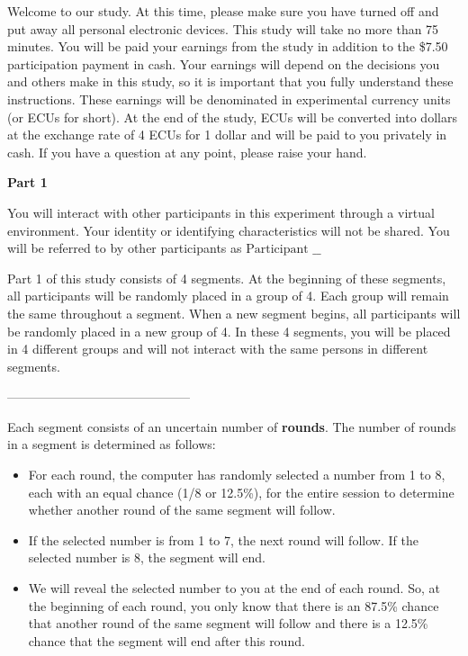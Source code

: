 \documentclass[thesis]{uathesis}
\begin{document}
\begin{body}
\begin{appendices}
Welcome to our study. At this time, please make sure you have turned off and put away
all personal electronic devices. This study will take no more than 75 minutes. You will be paid your earnings from the study in addition to the \$7.50 participation
payment in cash. Your earnings will depend on the decisions you and others make in this study, so it is important that you fully understand these instructions. These earnings will be denominated in experimental currency units (or ECUs for short). At the end of the study, ECUs will be converted into dollars at the exchange rate of 4 ECUs for 1 dollar and will be paid to you privately in cash. If you have a question at any point, please raise your hand.

\noindent\textbf{Part 1}

\medskip

You will interact with other participants in this experiment through a virtual environment. Your identity or identifying characteristics will not be shared. You will be referred to by other participants as \(\text{Participant \_\_}\)


Part 1 of this study consists of 4 segments. At the beginning of these segments, all participants will be randomly placed in a group of 4. Each group will remain the same throughout a segment. When a new segment begins, all participants will be randomly placed in a new group of 4. In these 4 segments, you will be placed in 4 different groups and will not interact with the same persons in different segments.

\vspace{0.2in}
\begin{center}
--------------------------------------------
\end{center}
\vspace{0.2in}

Each segment consists of an uncertain number of \textbf{rounds}. The number of rounds in a segment is determined as follows:
\begin{itemize}
    \item   For each round, the computer has randomly selected a number from 1 to 8, each with an equal chance (1/8 or 12.5\%), for the entire session to determine whether another round of the same segment will follow.
    \item 	If the selected number is from 1 to 7, the next round will follow. If the selected number is 8, the segment will end.
    \item 	We will reveal the selected number to you at the end of each round. So, at the beginning of each round, you only know that there is an 87.5\% chance that another round of the same segment will follow and there is a 12.5\% chance that the segment will end after this round.
\end{itemize}



\end{appendices}
\end{body}
\end{document}
